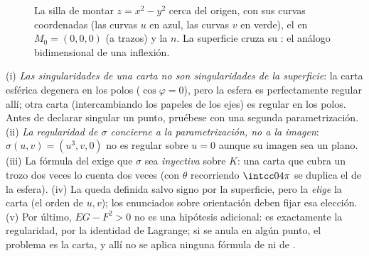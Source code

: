 \begin{figure}[ht]
\centering
{}
\caption{La silla de montar $z = x^2 - y^2$ cerca del origen, con sus
curvas coordenadas (las curvas $u$ en azul, las curvas $v$ en verde),
el  en $M_0 = (0,0,0)$ (a trazos) y la
 $n$. La superficie cruza su : el
análogo bidimensional de una inflexión.}
\label{fig:b2:surfaces:saddle}
\end{figure}

\begin{remark}
(i) \emph{Las singularidades de una carta no son singularidades de la
superficie}: la carta esférica degenera en los polos ($\cos\varphi =
0$), pero la esfera es perfectamente regular allí; otra carta
(intercambiando los papeles de los ejes) es regular en los polos.
Antes de declarar singular un punto, pruébese con una segunda
parametrización. (ii) \emph{La regularidad de $\sigma$ concierne a la
parametrización, no a la imagen}: $\sigma(u, v) = (u^3, v, 0)$ no es
regular sobre $u = 0$ aunque su imagen sea un plano. (iii) La fórmula
del  exige que $\sigma$ sea \emph{inyectiva} sobre $K$: una
carta que cubra un trozo dos veces lo cuenta dos veces (con $\theta$
recorriendo $\intcc0{4\pi}$ se duplica el  de la esfera). (iv)
La  queda definida salvo signo por la superficie,
pero la \emph{elige} la carta (el orden de $u, v$); los enunciados
sobre orientación deben fijar esa elección. (v) Por último, $EG - F^2
> 0$ no es una hipótesis adicional: es exactamente la regularidad,
por la identidad de Lagrange; si se anula en algún punto, el problema
es la carta, y allí no se aplica ninguna fórmula de  ni de .
\end{remark}

